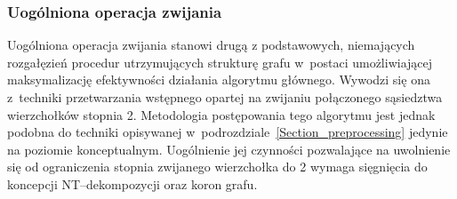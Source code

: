 \subsubsection{\textbf{Uogólniona operacja zwijania}}\label{sss_ckx_general_fold}
\par{
  Uogólniona operacja zwijania stanowi drugą z podstawowych, niemających rozgałęzień procedur utrzymujących strukturę grafu w~postaci umożliwiającej maksymalizację efektywności działania algorytmu głównego.
  Wywodzi się ona z~techniki przetwarzania wstępnego opartej na zwijaniu połączonego sąsiedztwa wierzchołków stopnia 2.
  Metodologia postępowania tego algorytmu jest jednak podobna do techniki opisywanej w~podrozdziale~\ref{Section_preprocessing} jedynie na poziomie konceptualnym.
  Uogólnienie jej czynności pozwalające na uwolnienie się od ograniczenia stopnia zwijanego wierzchołka do 2 wymaga sięgnięcia do koncepcji NT--dekompozycji oraz koron grafu.
}
